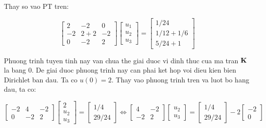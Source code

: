 Thay so vao PT tren:

\begin{equation}
    \begin{bmatrix}
        2 & -2 & 0\\
        -2 & 2+2 & -2 \\
        0 & -2 & 2
    \end{bmatrix}\begin{bmatrix}
        u_1 \\ u_2 \\ u_3
    \end{bmatrix} = \begin{bmatrix}
        1/24 \\ 1/12 + 1/6 \\ 5/24 + 1
    \end{bmatrix}
\end{equation}

Phuong trinh tuyen tinh nay van chua the giai duoc vi dinh thuc cua ma tran ${\bf K}$ la bang 0. De giai duoc phuong trinh nay can phai ket hop voi dieu kien bien Dirichlet ban dau. Ta co $u(0) = 2$. Thay vao phuong trinh tren va luot bo hang dau, ta co:

\begin{equation}
    \begin{bmatrix}
        -2 & 4 & -2 \\
        0 & -2 & 2
    \end{bmatrix}\begin{bmatrix}
        2 \\ u_2 \\ u_3
    \end{bmatrix} = \begin{bmatrix}
        1/4 \\ 29/24
    \end{bmatrix} \Leftrightarrow \begin{bmatrix}
        4 & -2 \\
        -2 & 2
    \end{bmatrix}\begin{bmatrix}
        u_2 \\ u_3
    \end{bmatrix} = \begin{bmatrix}
        1/4 \\ 29/24
    \end{bmatrix} - 2\begin{bmatrix}
        -2 \\ 0
    \end{bmatrix}
\end{equation}

